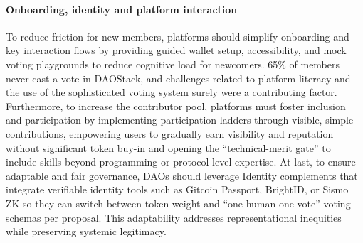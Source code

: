 \documentclass[10pt,lineno]{wlpeerj}
\begin{document}

  

\paragraph{Onboarding, identity and platform interaction}

To reduce friction for new members, platforms should simplify onboarding and key interaction flows by providing guided wallet setup, accessibility, and mock voting playgrounds to reduce cognitive load for newcomers.  65\% of members never cast a vote in DAOStack, and challenges related to platform literacy and the use of the sophisticated voting system surely were a contributing factor.
Furthermore, to increase the contributor pool, platforms must foster inclusion and participation by implementing participation ladders through visible, simple contributions, empowering users to gradually earn visibility and reputation without significant token buy-in and opening the ``technical-merit gate'' to include skills beyond programming or protocol-level expertise.
At last, to ensure adaptable and fair governance, DAOs should leverage Identity complements that integrate verifiable identity tools such as Gitcoin Passport, BrightID, or Sismo ZK so they can switch between token-weight and ``one-human-one-vote'' voting schemas per proposal. This adaptability addresses representational inequities while preserving systemic legitimacy.

\end{document}
